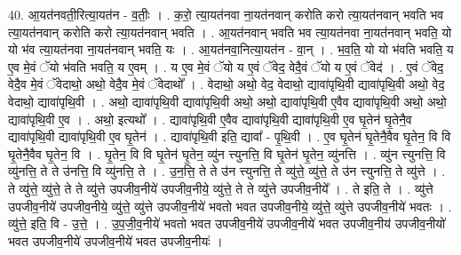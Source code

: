\documentclass[17pt]{extarticle}
\begin{document}
40. आ॒यत॑नवती॒रित्या॒यत॑न - व॒तीः॒ । . क॒रो॒ त्या॒यत॑नवा ना॒यत॑नवान् करोति करो त्या॒यत॑नवान् भवति भव त्या॒यत॑नवान् करोति करो त्या॒यत॑नवान् भवति । . आ॒यत॑नवान् भवति भव त्या॒यत॑नवा ना॒यत॑नवान् भवति॒ यो यो भ॑व त्या॒यत॑नवा ना॒यत॑नवान् भवति॒ यः । . आ॒यत॑नवा॒नित्या॒यत॑न - वा॒न् । . भ॒व॒ति॒ यो यो भ॑वति भवति॒ य ए॒व मे॒वं ॅयो भ॑वति भवति॒ य ए॒वम् । . य ए॒व मे॒वं ॅयो य ए॒वं ॅवेद॒ वेदै॒वं ॅयो य ए॒वं ॅवेद॑ । . ए॒वं ॅवेद॒ वेदै॒व मे॒वं ॅवेदाथो॒ अथो॒ वेदै॒व मे॒वं ॅवेदाथो᳚ । . वेदाथो॒ अथो॒ वेद॒ वेदाथो॒ द्यावा॑पृथि॒वी द्यावा॑पृथि॒वी अथो॒ वेद॒ वेदाथो॒ द्यावा॑पृथि॒वी । . अथो॒ द्यावा॑पृथि॒वी द्यावा॑पृथि॒वी अथो॒ अथो॒ द्यावा॑पृथि॒वी ए॒वैव द्यावा॑पृथि॒वी अथो॒ अथो॒ द्यावा॑पृथि॒वी ए॒व । . अथो॒ इत्यथो᳚ । . द्यावा॑पृथि॒वी ए॒वैव द्यावा॑पृथि॒वी द्यावा॑पृथि॒वी ए॒व घृ॒तेन॑ घृ॒तेनै॒व द्यावा॑पृथि॒वी द्यावा॑पृथि॒वी ए॒व घृ॒तेन॑ । . द्यावा॑पृथि॒वी इति॒ द्यावा᳚ - पृ॒थि॒वी । . ए॒व घृ॒तेन॑ घृ॒तेनै॒वैव घृ॒तेन॒ वि वि घृ॒तेनै॒वैव घृ॒तेन॒ वि । . घृ॒तेन॒ वि वि घृ॒तेन॑ घृ॒तेन॒ व्यु॑न त्त्युनत्ति॒ वि घृ॒तेन॑ घृ॒तेन॒ व्यु॑नत्ति । . व्यु॑न त्त्युनत्ति॒ वि व्यु॑नत्ति॒ ते ते उ॑नत्ति॒ वि व्यु॑नत्ति॒ ते । . उ॒न॒त्ति॒ ते ते उ॑न त्त्युनत्ति॒ ते व्यु॑त्ते॒ व्यु॑त्ते॒ ते उ॑न त्त्युनत्ति॒ ते व्यु॑त्ते । . ते व्यु॑त्ते॒ व्यु॑त्ते॒ ते ते व्यु॑त्ते उपजीव॒नीये॑ उपजीव॒नीये॒ व्यु॑त्ते॒ ते ते व्यु॑त्ते उपजीव॒नीये᳚ । . ते इति॒ ते । . व्यु॑त्ते उपजीव॒नीये॑ उपजीव॒नीये॒ व्यु॑त्ते॒ व्यु॑त्ते उपजीव॒नीये॑ भवतो भवत उपजीव॒नीये॒ व्यु॑त्ते॒ व्यु॑त्ते उपजीव॒नीये॑ भवतः । . व्यु॑त्ते॒ इति॒ वि - उ॒त्ते॒ । . उ॒प॒जी॒व॒नीये॑ भवतो भवत उपजीव॒नीये॑ उपजीव॒नीये॑ भवत उपजीव॒नीय॑ उपजीव॒नीयो॑ भवत उपजीव॒नीये॑ उपजीव॒नीये॑ भवत उपजीव॒नीयः॑ । \newline
\end{document}
